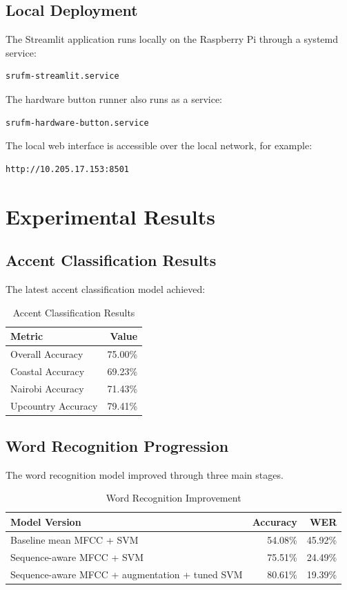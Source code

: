 \documentclass[12pt,a4paper]{report}
\begin{document}
\section{Local Deployment}
The Streamlit application runs locally on the Raspberry Pi through a systemd service:

\begin{verbatim}
srufm-streamlit.service
\end{verbatim}

The hardware button runner also runs as a service:

\begin{verbatim}
srufm-hardware-button.service
\end{verbatim}

The local web interface is accessible over the local network, for example:

\begin{verbatim}
http://10.205.17.153:8501
\end{verbatim}

\chapter{Experimental Results}

\section{Accent Classification Results}
The latest accent classification model achieved:

\begin{table}[h]
\centering
\caption{Accent Classification Results}
\begin{tabular}{lr}
\toprule
\textbf{Metric} & \textbf{Value} \\
\midrule
Overall Accuracy & 75.00\% \\
Coastal Accuracy & 69.23\% \\
Nairobi Accuracy & 71.43\% \\
Upcountry Accuracy & 79.41\% \\
\bottomrule
\end{tabular}
\end{table}

\section{Word Recognition Progression}
The word recognition model improved through three main stages.

\begin{table}[h]
\centering
\caption{Word Recognition Improvement}
\begin{tabular}{p{7cm}rr}
\toprule
\textbf{Model Version} & \textbf{Accuracy} & \textbf{WER} \\
\midrule
Baseline mean MFCC + SVM & 54.08\% & 45.92\% \\
Sequence-aware MFCC + SVM & 75.51\% & 24.49\% \\
Sequence-aware MFCC + augmentation + tuned SVM & 80.61\% & 19.39\% \\
\bottomrule
\end{tabular}
\end{table}
\end{document}
